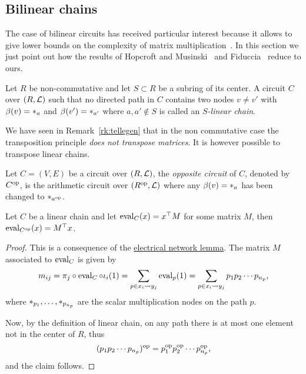 \subsection{Bilinear chains}
\label{sec:bilinear-chains}

The case of bilinear circuits has received particular interest because
it allows to give lower bounds on the complexity of matrix
multiplication~\cite{fiduccia:phd}. In this section we just point out
how the results of Hopcroft and Musinski~\cite{hopcroft+musinski73}
and Fiduccia~\cite{fiduccia:phd} reduce to ours.

\begin{definition}
  Let $R$ be non-commutative and let $S\subset R$ be a subring of its
  center. A circuit $C$ over $(R,\mathcal{L})$ such that no directed path
  in $C$ contains two nodes $v\ne v'$ with $\beta(v)=*_{a}$ and
  $\beta(v')=*_{a'}$ where $a,a'\not\in S$ is called an
  \emph{$S$-linear chain}.
\end{definition}

We have seen in Remark~\ref{rk:tellegen} that in the non commutative
case the transposition principle \emph{does not transpose matrices}.
It is however possible to transpose linear chains.

\begin{definition}
  Let $C=(V,E)$ be a circuit over $(R,\mathcal{L})$, the
  \emph{opposite circuit} of $C$,
  denoted by $C^{\mathrm{op}}$, is the arithmetic circuit over
  $(R^{\mathrm{op}},\mathcal{L})$ where any $\beta(v)=*_{a}$ has been changed
  to $*_{a^{\mathrm{op}}}$.
\end{definition}

\begin{proposition}
  Let $C$ be a linear chain and let $\operatorname{eval}_C(x)=x^\top M$ for some
  matrix $M$, then $\operatorname{eval}_{C^{\mathrm{op}}}(x)=M^\top x$.
\end{proposition}
\begin{proof}
  This is a consequence of the
  \hyperref[th:electrical-network]{electrical network lemma}.  The
  matrix $M$ associated to $\operatorname{eval}_C$ is given by
  \begin{equation}
    \label{eq:243}
    m_{ij} = \pi_j\circ\operatorname{eval}_C\circ\iota_i(1)
    = \sum_{p\in x_i\leadsto y_j}\operatorname{eval}_p(1) =
    \sum_{p\in x_i\leadsto y_j} p_1p_2\cdots p_{n_p}
    \text{,}
  \end{equation}
  where $*_{p_1},\ldots,*_{p_{n_p}}$ are the scalar
  multiplication nodes on the path $p$.

  Now, by the definition of linear chain, on any path there is at most
  one element not in the center of $R$, thus
  \begin{equation}
    \label{eq:245}
    (p_1p_2\cdots p_{n_p})^{\mathrm{op}}=p_{1}^{\mathrm{op}} p_2^{\mathrm{op}}\cdots p_{n_p}^{\mathrm{op}}
    \text{,}
  \end{equation}
  and the claim follows.
\end{proof}

